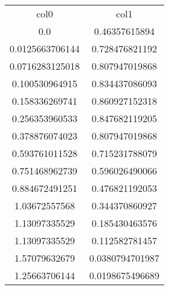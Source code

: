 \begin{table}
\begin{tabular}{cc}
col0 & col1 \\
0.0 & 0.46357615894 \\
0.0125663706144 & 0.728476821192 \\
0.0716283125018 & 0.807947019868 \\
0.100530964915 & 0.834437086093 \\
0.158336269741 & 0.860927152318 \\
0.256353960533 & 0.847682119205 \\
0.378876074023 & 0.807947019868 \\
0.593761011528 & 0.715231788079 \\
0.751468962739 & 0.596026490066 \\
0.884672491251 & 0.476821192053 \\
1.03672557568 & 0.344370860927 \\
1.13097335529 & 0.185430463576 \\
1.13097335529 & 0.112582781457 \\
1.57079632679 & 0.0380794701987 \\
1.25663706144 & 0.0198675496689 \\
\end{tabular}
\end{table}
